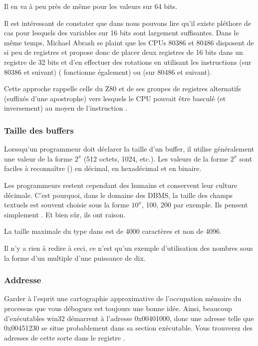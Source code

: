 Il en va à peu près de même pour les valeurs sur 64 bits.


Il est intéressant de constater que dans 
nous pouvons lire qu'il existe pléthore de cas pour lesquels des variables sur 16 bits sont largement suffisantes.
Dans le même temps, Michael Abrash se plaint que les CPUs 80386 et 80486 disposent de si peu de registres et propose donc de
placer deux registres de 16 bits dans un registre de 32 bits et d'en effectuer des rotations en utilisant les instructions
 (sur 80386 et suivant) ( fonctionne également) ou
 (sur 80486 et suivant).

Cette approche rappelle celle du Z80 et de ses groupes de registres alternatifs (suffixés d'une apostrophe)
vers lesquels le CPU pouvait être basculé (et inversement) au moyen de l'instruction .

\subsubsection{Taille des buffers}

Lorssqu'un programmeur doit déclarer la taille d'un buffer, il utilise généralement une valeur de la
forme $2^x$ (512 octets, 1024, etc.).
Les valeurs de la forme $2^x$ sont faciles à reconnaître () en décimal, en hexadécimal
et en binaire.

Les programmeurs restent cependant des humains et conservent leur culture décimale.
C'est pourquoi, dans le domaine des \ac{DBMS}, la taille des champs textuels est souvent choisie sous la forme $10^x$,
100, 200 par exemple.
Ils pensent simplement .
Et bien sûr, ils ont raison.

La taille maximale du type  dans \oracle est de 4000 caractères et non de 4096.

Il n'y a rien à redire à ceci, ce n'est qu'un exemple d'utilisation des nombres sous la forme d'un
multiple d'une puissance de dix.

\subsubsection{Addresse}

Garder à l'esprit une cartographie approximative de l'occupation mémoire du processus que vous
déboguez est toujours une bonne idée.
Ainsi, beaucoup d'exécutables win32 démarrent à l'adresse 0x00401000, donc une adresse telle que
0x00451230 se situe probablement dans sa section exécutable. Vous trouverez des adresses de cette
sorte dans le registre .

